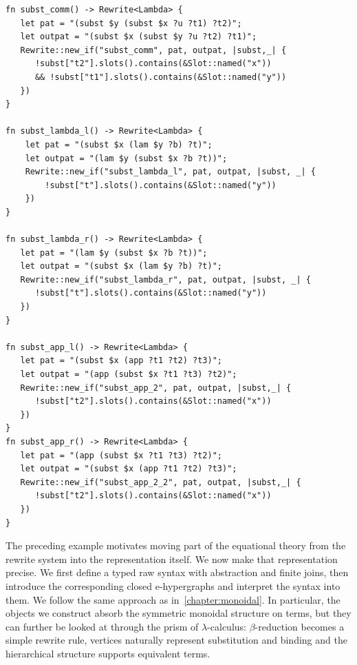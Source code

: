 \clearpage

\begin{listing*}
	\centering
	\begin{minipage}{0.8\textwidth}
	\begin{verbatim}
fn subst_comm() -> Rewrite<Lambda> {
   let pat = "(subst $y (subst $x ?u ?t1) ?t2)";
   let outpat = "(subst $x (subst $y ?u ?t2) ?t1)";
   Rewrite::new_if("subst_comm", pat, outpat, |subst,_| {
      !subst["t2"].slots().contains(&Slot::named("x")) 
      && !subst["t1"].slots().contains(&Slot::named("y"))
   })
}

fn subst_lambda_l() -> Rewrite<Lambda> {
    let pat = "(subst $x (lam $y ?b) ?t)";
    let outpat = "(lam $y (subst $x ?b ?t))";
    Rewrite::new_if("subst_lambda_l", pat, outpat, |subst, _| {
        !subst["t"].slots().contains(&Slot::named("y"))
    })
}

fn subst_lambda_r() -> Rewrite<Lambda> {
   let pat = "(lam $y (subst $x ?b ?t))";
   let outpat = "(subst $x (lam $y ?b) ?t)";
   Rewrite::new_if("subst_lambda_r", pat, outpat, |subst, _| {
      !subst["t"].slots().contains(&Slot::named("y"))
   })
}

fn subst_app_l() -> Rewrite<Lambda> {
   let pat = "(subst $x (app ?t1 ?t2) ?t3)";
   let outpat = "(app (subst $x ?t1 ?t3) ?t2)";
   Rewrite::new_if("subst_app_2", pat, outpat, |subst,_| {
      !subst["t2"].slots().contains(&Slot::named("x"))
   })
}
fn subst_app_r() -> Rewrite<Lambda> {
   let pat = "(app (subst $x ?t1 ?t3) ?t2)";
   let outpat = "(subst $x (app ?t1 ?t2) ?t3)";
   Rewrite::new_if("subst_app_2_2", pat, outpat, |subst,_| {
      !subst["t2"].slots().contains(&Slot::named("x"))
   })
}
	\end{verbatim}
\end{minipage}
	\caption{Graphical equivalence rules for $\lambda_{\text{lsub}}$.}
	\label{listing:graphical_equivalence}
\end{listing*}

The preceding example motivates moving part of the equational theory
from the rewrite system into the representation itself. 
We now make that representation precise. 
We first define a typed raw syntax with
abstraction and finite joins, then introduce the corresponding closed
e-hypergraphs and interpret the syntax into them.
We follow the same approach as in~\cref{chapter:monoidal}.
In particular, the objects we construct absorb the symmetric monoidal structure on terms, but they can further be looked at through the prism of $\lambda$-calculus: $\beta$-reduction becomes a simple rewrite rule, vertices naturally represent substitution and binding and the hierarchical structure supports equivalent terms.


